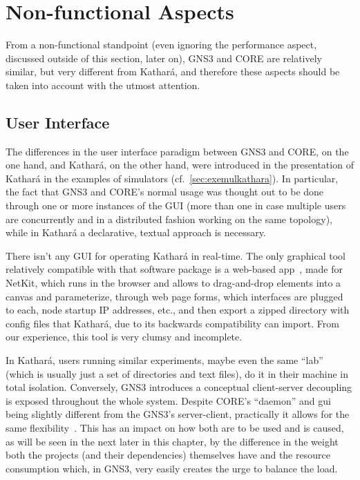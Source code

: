 \section{Non-functional Aspects}
\label{sec:comparativenonfunctional}

From a non-functional standpoint (even ignoring the performance aspect, discussed outside of this section, later on), GNS3 and CORE are relatively similar, but very different from Kathará, and therefore these aspects should be taken into account with the utmost attention.

\subsection{User Interface}
\label{subsec:comparativeui}

The differences in the user interface paradigm between GNS3 and CORE, on the one hand, and Kathará, on the other hand, were introduced in the presentation of Kathará in the examples of simulators (cf.~\ref{sec:exemulkathara}).
In particular, the fact that GNS3 and CORE's normal usage was thought out to be done through one or more instances of the GUI (more than one in case multiple users are concurrently and in a distributed fashion working on the same topology), while in Kathará a declarative, textual approach is necessary.

There isn't any GUI for operating Kathará in real-time.
The only graphical tool relatively compatible with that software package is a web-based app~\cite{netkitlabgen}, made for NetKit, which runs in the browser and allows to drag-and-drop elements into a canvas and parameterize, through web page forms, which interfaces are plugged to each, node startup IP addresses, etc., and then export a zipped directory with config files that Kathará, due to its backwards compatibility can import.
From our experience, this tool is very clumsy and incomplete.

In Kathará, users running similar experiments, maybe even the same ``lab'' (which is usually just a set of directories and text files), do it in their machine in total isolation.
Conversely, GNS3 introduces a conceptual client-server decoupling is exposed throughout the whole system.
Despite CORE's ``daemon'' and \gls{gui} being slightly different from the GNS3's server-client, practically it allows for the same flexibility~\cite{coreghdocs}.
This has an impact on how both are to be used and is caused, as will be seen in the next later in this chapter, by the difference in the weight both the projects (and their dependencies) themselves have and the resource consumption which, in GNS3, very easily creates the urge to balance the load.

